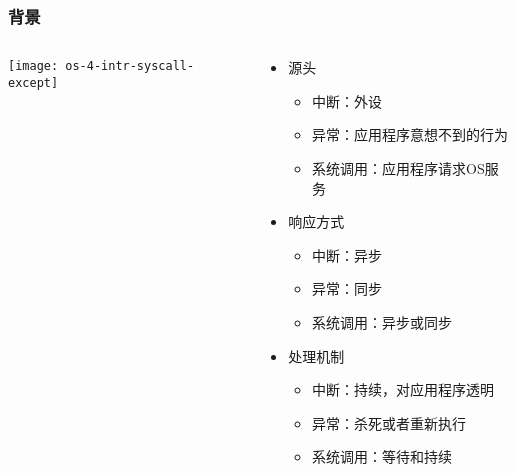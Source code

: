 \begin{frame}[plain]
	\frametitle{背景}
	
	\begin{columns}
		
		\begin{column}{0.5\textwidth}
			\centering
			\texttt{[image: os-4-intr-syscall-except]}
		\end{column}
		
		\begin{column}{0.5\textwidth}
			
			\begin{itemize}
				\item 源头 
				\begin{itemize}
					\item 中断：外设 \pause
					\item 异常：应用程序意想不到的行为 \pause
					\item 系统调用：应用程序请求OS服务 \pause
				\end{itemize}  
				\item 响应方式  \pause
				\begin{itemize}
					\item 中断：异步
					\item 异常：同步
					\item 系统调用：异步或同步
				\end{itemize}  \pause
				\item 处理机制
				\begin{itemize} \pause
					\item 中断：持续，对应用程序透明 \pause
					\item 异常：杀死或者重新执行 \pause
					\item 系统调用：等待和持续
				\end{itemize}

			\end{itemize}		
			
		\end{column}
		
	\end{columns}
	
\end{frame}
